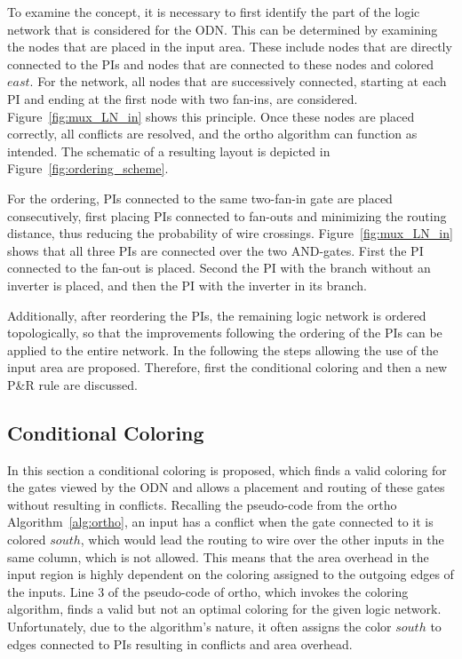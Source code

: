 To examine the concept, it is necessary to first identify the part of the logic network that is considered for the ODN. This can be determined by examining the nodes that are placed in the input area. These include nodes that are directly connected to the PIs and nodes that are connected to these nodes and colored $east$. For the network, all nodes that are successively connected, starting at each PI and ending at the first node with two fan-ins, are considered. Figure~\ref{fig:mux_LN_in} shows this principle. Once these nodes are placed correctly, all conflicts are resolved, and the ortho algorithm can function as intended. The schematic of a resulting layout is depicted in Figure~\ref{fig:ordering_scheme}.

For the ordering, PIs connected to the same two-fan-in gate are placed consecutively, first placing PIs connected to fan-outs and minimizing the routing distance, thus reducing the probability of wire crossings. Figure~\ref{fig:mux_LN_in} shows that all three PIs are connected over the two AND-gates. First the PI connected to the fan-out is placed. Second the PI with the branch without an inverter is placed, and then the PI with the inverter in its branch.

Additionally, after reordering the PIs, the remaining logic network is ordered topologically, so that the improvements following the ordering of the PIs can be applied to the entire network. In the following the steps allowing the use of the input area are proposed. Therefore, first the conditional coloring and then a new P\&R rule are discussed.

\subsection{Conditional Coloring}\label{subsec:coco}

In this section a conditional coloring is proposed, which finds a valid coloring for the gates viewed by the ODN and allows a placement and routing of these gates without resulting in conflicts. Recalling the pseudo-code from the ortho Algorithm~\ref{alg:ortho}, an input has a conflict when the gate connected to it is colored $south$, which would lead the routing to wire over the other inputs in the same column, which is not allowed. This means that the area overhead in the input region is highly dependent on the coloring assigned to the outgoing edges of the inputs. Line $3$ of the pseudo-code of ortho, which invokes the coloring algorithm, finds a valid but not an optimal coloring for the given logic network. Unfortunately, due to the algorithm's nature, it often assigns the color $south$ to edges connected to PIs resulting in conflicts and area overhead.

